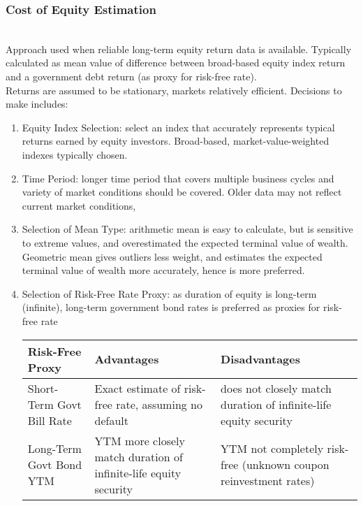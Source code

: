 \subsubsection{Cost of Equity Estimation}

\begin{method} \\
Approach used when reliable long-term equity return data is available. Typically calculated as mean value of difference between broad-based equity index return and a government debt return (as proxy for risk-free rate).\\
Returns are assumed to be stationary, markets relatively efficient. Decisions to make includes:
\begin{enumerate}[label=\roman*.]
\setlength{\itemsep}{0pt}
\item Equity Index Selection: select an index that accurately represents typical returns earned by equity investors. Broad-based, market-value-weighted indexes typically chosen.
\item Time Period: longer time period that covers multiple business cycles and variety of market conditions should be covered. Older data may not reflect current market conditions,
\item Selection of Mean Type: arithmetic mean is easy to calculate, but is sensitive to extreme values, and overestimated the expected terminal value of wealth. Geometric mean gives outliers less weight, and estimates the expected terminal value of wealth more accurately, hence is more preferred.
\item Selection of Risk-Free Rate Proxy: as duration of equity is long-term (infinite), long-term government bond rates is preferred as proxies for risk-free rate\\
\begin{tabularx}{\textwidth}{p{12.5em}|X|X}
\hline
\rowcolor{gray!30}
Risk-Free Proxy & Advantages & Disadvantages \\
\hline
Short-Term Govt Bill Rate & Exact estimate of risk-free rate, assuming no default & does not closely match duration of infinite-life equity security \\
\hline
Long-Term Govt Bond YTM & YTM more closely match duration of infinite-life equity security & YTM not completely risk-free (unknown coupon reinvestment rates) \\
\hline
\end{tabularx}
\end{enumerate}
\end{method}

